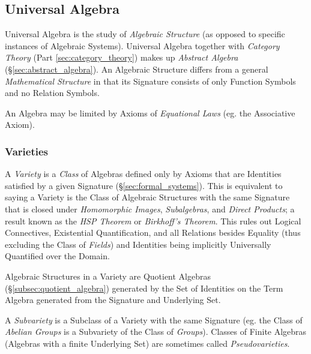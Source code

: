 \documentclass{article}
\begin{document}
\subsection{Universal Algebra}\label{subsec:universal_algebra}

Universal Algebra is the study of \emph{Algebraic Structure} (as
opposed to specific instances of Algebraic Systems). Universal Algebra
together with \emph{Category Theory} (Part \ref{sec:category_theory})
makes up \emph{Abstract Algebra} (\S\ref{sec:abstract_algebra}). An
Algebraic Structure differs from a general \emph{Mathematical
  Structure} in that its Signature consists of only Function Symbols
and no Relation Symbols.

An Algebra may be limited by Axioms of \emph{Equational Laws} (eg. the
Associative Axiom).

\subsubsection{Varieties}

A \emph{Variety} is a \emph{Class} of Algebras defined only by Axioms
that are Identities satisfied by a given Signature
(\S\ref{sec:formal_systems}). This is equivalent to saying a Variety
is the Class of Algebraic Structures with the same Signature that is
closed under \emph{Homomorphic Images}, \emph{Subalgebras}, and
\emph{Direct Products}; a result known as the \emph{HSP Theorem} or
\emph{Birkhoff's Theorem}\cite{birkhoff35}. This rules out Logical
Connectives, Existential Quantification, and all Relations besides
Equality (thus excluding the Class of \emph{Fields}) and Identities
being implicitly Universally Quantified over the Domain.

Algebraic Structures in a Variety are Quotient Algebras
(\S\ref{subsec:quotient_algebra}) generated by the Set of Identities
on the Term Algebra generated from the Signature and Underlying Set.

A \emph{Subvariety} is a Subclass of a Variety with the same Signature
(eg. the Class of \emph{Abelian Groups} is a Subvariety of the Class
of \emph{Groups}). Classes of Finite Algebras (Algebras with a finite
Underlying Set) are sometimes called \emph{Pseudovarieties}.
\end{document}
